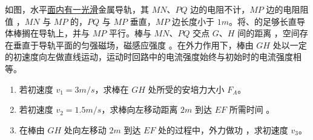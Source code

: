 \begin{problem}
如图，水平\underline{面内有一光滑}金属导轨，其 $MN$、$PQ$ 边的电阻不计，$MP$ 边的电阻阻值 ，$MN$ 与 $MP$ 的，$PQ$ 与 $MP$ 垂直，$MP$ 边长度小于 $1\unit{m}$。将、的足够长直导体棒搁在导轨上，并与 $MP$ 平行。棒与 $MN$、$PQ$ 交点 $G$、$H$ 间的距离 ，空间存在垂直于导轨平面的匀强磁场，磁感应强度 。在外力作用下，棒由 $GH$ 处以一定的初速度向左做直线运动，运动时回路中的电流强度始终与初始时的电流强度相等。


\begin{enumerate}[label=(\arabic*)]
\item 若初速度 $v_1=3\unit{m/s}$，求棒在 $GH$ 处所受的安培力大小 $F_A$。
\item 若初速度 $v_2=1.5\unit{m/s}$，求棒向左移动距离 $2\unit{m}$ 到达 $EF$ 所需时间 。
\item 在棒由 $GH$ 处向左移动 $2\unit{m}$ 到达 $EF$ 处的过程中，外力做功 ，求初速度 $v_3$。
\end{enumerate}
\end{problem}
